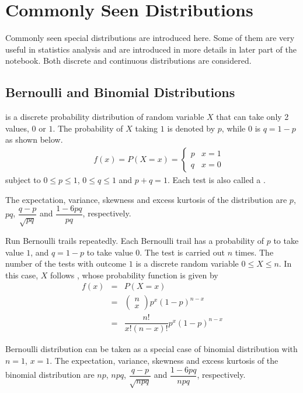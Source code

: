\chapter{Commonly Seen Distributions} \label{ch:commondistribution}

Commonly seen special distributions are introduced here. Some of them are very useful in statistics analysis and are introduced in more details in later part of the notebook. Both discrete and continuous distributions are considered.

\section{Bernoulli and Binomial Distributions}

 is a discrete probability distribution of random variable $X$ that can take only 2 values, $0$ or $1$. The probability of $X$ taking $1$ is denoted by $p$, while $0$ is $q=1-p$ as shown below.
\begin{eqnarray}
	&& f(x) = P(X=x) = \left\{\begin{array}{cc}
		p & x=1 \\
		q & x=0
	\end{array}\right. \nonumber
\end{eqnarray}
subject to $0\leq p \leq 1$, $0\leq q \leq 1$ and $p+q=1$. Each test is also called a .

The expectation, variance, skewness and excess kurtosis of the distribution are $p$, $pq$, $\dfrac{q-p}{\sqrt{pq}}$ and $\dfrac{1-6pq}{pq}$, respectively.

Run Bernoulli trails repeatedly. Each Bernoulli trail has a probability of $p$ to take value $1$, and $q=1-p$ to take value $0$. The test is carried out $n$ times. The number of the tests with outcome $1$ is a discrete random variable $0\leq X \leq n$. In this case, $X$ follows , whose probability function is given by
\begin{eqnarray}
	f(x) &=& P(X=x) \nonumber \\
	&=& \left(\begin{array}{c}
		n \\
		x
	\end{array}\right)p^x(1-p)^{n-x} \nonumber \\
	&=& \dfrac{n!}{x!(n-x)!}p^x(1-p)^{n-x}
\end{eqnarray}

Bernoulli distribution can be taken as a special case of binomial distribution with $n=1$, $x=1$. The expectation, variance, skewness and excess kurtosis of the binomial distribution are $np$, $npq$, $\dfrac{q-p}{\sqrt{npq}}$ and $\dfrac{1-6pq}{npq}$, respectively.

